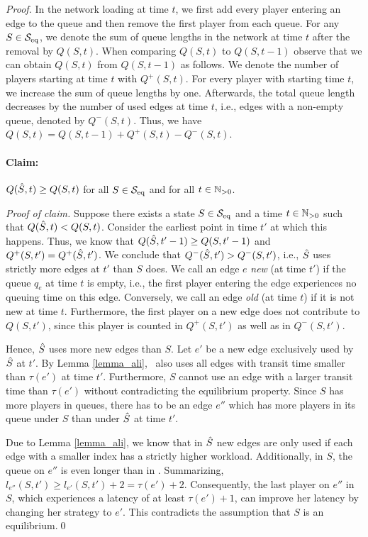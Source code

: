 \lemmaOneLayerNew*
\begin{proof}
In the network loading at time $t$, we first add every player entering an edge to the queue and then remove the first player from each queue. For any $S \in \mathcal{S}_{\operatorname{eq}}$, we denote the sum of queue lengths in the network at time $t$ after the removal by $Q(S,t)$. When comparing $Q(S,t)$ to $Q(S,t-1)$ observe that we can obtain $Q(S,t)$ from $Q(S,t-1)$ as follows. We denote the number of players starting at time $t$ with $Q^+(S,t)$. For every player with starting time $t$, we increase the sum of queue lengths by one. Afterwards, the total queue length decreases by the number of used edges at time $t$, i.e., edges with a non-empty queue, denoted by $Q^-(S,t)$. Thus, we have $Q(S,t)= Q(S,t-1)+Q^+(S,t)-Q^-(S,t)$.
\paragraph{Claim:} $Q(\hat{S},t) \geq Q(S,t)$ for all $S\in \mathcal{S}_{\operatorname{eq}}$ and for all $t\in \mathbb{N}_{>0}$.

\noindent \textit{Proof of claim.}
Suppose there exists a state $S\in \mathcal{S}_{\operatorname{eq}}$ and a time $t\in \mathbb{N}_{>0}$ such that $Q(\hat{S},t) < Q(S,t)$. 
Consider the earliest point in time $t'$ at which this happens. Thus, we know that $Q(\hat{S},t'-1) \geq Q(S,t'-1)$ and $Q^+(S,t')= Q^+(\hat{S},t')$.
We conclude that $Q^-(\hat{S},t') > Q^-(S,t')$, i.e., $\hat{S}$ uses strictly more edges at $t'$ than $S$ does.
We call an edge $e$ \emph{new} (at time $t'$) if the queue $q_e$ at time $t$ is empty, i.e., the first player entering the edge experiences no queuing time on this edge. Conversely, we call an edge \emph{old} (at time $t$) if it is not new at time $t$. Furthermore, the first player on a new edge does not contribute to $Q(S,t')$, since this player is counted in $Q^+(S,t')$ as well as in $Q^-(S,t')$. 

Hence, $\hat{S}$ uses more new edges than $S$. Let $e'$ be a new edge exclusively used by $\hat{S}$ at $t'$. By Lemma \ref{lemma_ali}, \badNash\ also uses all edges with transit time smaller than $\tau(e')$ at time $t'$. Furthermore, $S$ cannot use an edge with a larger transit time than $\tau(e')$ without contradicting the equilibrium property. Since $S$ has more players in queues, there has to be an edge $e''$ which has more players in its queue under $S$ than under $\hat{S}$ at time $t'$.


Due to Lemma \ref{lemma_ali}, we know that in $\hat{S}$ new edges are only used if each edge with a smaller index has a strictly higher %
workload. Additionally, in $S$, the queue on $e''$ is even longer than in \badNash. Summarizing, $l_{e''}(S,t')\ge l_{e'}(S,t')+2 = \tau(e')+2$.
Consequently, the last player on $e''$ in $S$, which experiences a latency of at least $\tau(e')+1$, can improve her latency by changing her strategy to $e'$. This contradicts the assumption that $S$ is an equilibrium.\qed


\end{proof}
